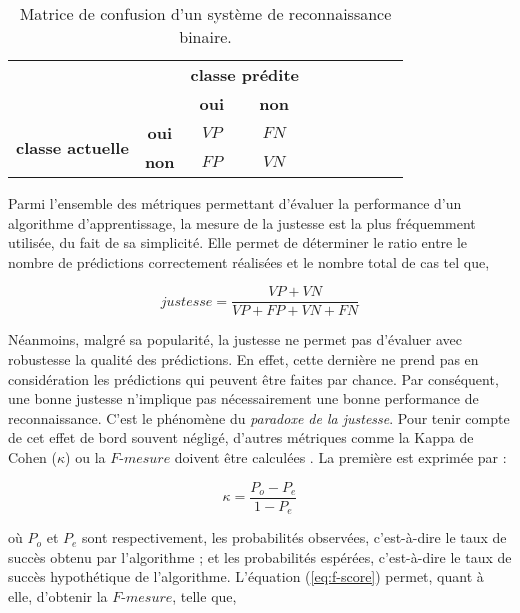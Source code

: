 \begin{table}[H]
	\begin{center}
		\caption{Matrice de confusion d'un système de reconnaissance binaire.}
		\label{tab:conf_mat}
		\begin{tabular}{llllllllll}
			\cline{3-4}
			& \multicolumn{1}{l|}{} & \multicolumn{2}{c|}{\textbf{classe prédite}} \\ \cline{3-4}
	        & \multicolumn{1}{l|}{} & \multicolumn{1}{c|}{\textbf{oui}} & \multicolumn{1}{c|}{\textbf{non}} \\ \cline{1-4}
			\multicolumn{1}{|c|}{\multirow{2}{*}{\textbf{classe actuelle}}} & \multicolumn{1}{c|}{\textbf{oui}} & \multicolumn{1}{c|}{$VP$} & \multicolumn{1}{c|}{$FN$} \\ \cline{2-4}
			\multicolumn{1}{|c|}{} & \multicolumn{1}{c|}{\textbf{non}} & \multicolumn{1}{c|}{$FP$} & \multicolumn{1}{c|}{$VN$} \\ \cline{1-4}
		\end{tabular}
	\end{center}
\end{table}

Parmi l'ensemble des métriques permettant d'évaluer la performance d'un algorithme d'apprentissage, la mesure de la justesse est la plus fréquemment utilisée, du fait de sa simplicité. Elle permet de déterminer le ratio entre le nombre de prédictions correctement réalisées et le nombre total de cas tel que,

\begin{equation}
	justesse = \frac{VP+VN}{VP+FP+VN+FN}
\end{equation}

Néanmoins, malgré sa popularité, la justesse ne permet pas d'évaluer avec robustesse la qualité des prédictions. En effet, cette dernière ne prend pas en considération les prédictions qui peuvent être faites par chance. Par conséquent, une bonne justesse n'implique pas nécessairement une bonne performance de reconnaissance. C'est le phénomène du \textit{paradoxe de la justesse}. Pour tenir compte de cet effet de bord souvent négligé, d'autres métriques comme la Kappa de Cohen ($\kappa$) ou la $F\mbox{-} mesure$ doivent être calculées \citep{Ben-David2007a}. La première est exprimée par :

\begin{equation}
	\label{eq:kappa}
	\kappa = \frac{P_o - P_e}{1 - P_e}
\end{equation}

\noindent où $P_o$ et $P_e$ sont respectivement, les probabilités observées, c'est-à-dire le taux de succès obtenu par l'algorithme ; et les probabilités espérées, c'est-à-dire le taux de succès hypothétique de l'algorithme. L'équation (\ref{eq:f-score}) permet, quant à elle, d'obtenir la $F\mbox{-} mesure$, telle que,

